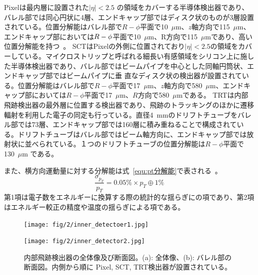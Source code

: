 Pixelは最内層に設置された$|\eta| < 2.5$ の領域をカバーする半導体検出器であり、バレル部では同心円状に4層、エンドキャップ部ではディスク状のものが3層設置されている。位置分解能はバレル部で$R-\phi$平面で10~$\mu$m、$z$軸方向で115~$\mu$m、エンドキャップ部においては$R-\rm{\phi}$平面で10~$\mu$m、R方向で115~$\mu$mであり、高い位置分解能を持つ~\cite{Aad:1129811}。
SCTはPixelの外側に位置されており$|\eta| < 2.5$の領域をカバーしている。マイクロストリップと呼ばれる細長い有感領域をシリコン上に施した半導体検出器であり、バレル部ではビームパイプを中心とした同軸円筒状、エンドキャップ部ではビームパイプに垂
直なディスク状の検出器が設置されている。位置分解能はバレル部で$R-\phi$平面で17~$\mu$m、$z$軸方向で580~$\mu$m、エンドキャップ部においては$R-\phi$平面で17~$\mu$m、$R$方向で580~$\mu$mである\cite{Aad:1129811}。
TRTは内部飛跡検出器の最外層に位置する検出器であり、飛跡のトラッキングのほかに遷移輻射を利用した電子の同定も行っている。直径4~mmのドリフトチューブをバレル部では73層、エンドキャップ部では160層に積み重ねることで構成されている。ドリフトチューブはバレル部ではビーム軸方向に、エンドキャップ部では放射状に並べられている。１つのドリフトチューブの位置分解能は$R-\phi$平面で130~$\mu$m である。

また、横方向運動量に対する分解能は式~\eqref{equ:pt分解能}で表される~\cite{Aad:1129811}。
\begin{equation}
    \frac{\sigma_{p_{T}}}{p_{T}} = 0.05 \%\times p_{T}\oplus 1 \%
　\label{equ:pt分解能}
\end{equation}
第1項は電子数をエネルギーに換算する際の統計的な揺らぎにの項であり、第2項はエネルギー較正の精度や温度の揺らぎによる項である。

\begin{figure}
    \centering
    \begin{minipage}[b]{0.4\linewidth}
        \centering
        \hspace*{-1cm}
        \texttt{[image: fig/2/inner\_detectoer1.jpg]}
        \vspace{10pt}
        \subcaption{}
        \label{fig:内部飛跡検出器の概略図1}
    \end{minipage}
    \hfill
    \begin{minipage}[b]{0.5\linewidth}
        \centering
        \texttt{[image: fig/2/inner\_detector2.jpg]}
        \vspace{10pt}
        \subcaption{}
        \label{fig:内部飛跡検出器の概略図2}
    \end{minipage}
    \caption{内部飛跡検出器の全体像及び断面図。(a): 全体像\cite{Aad:1129811}、(b): バレル部の断面図\cite{Collaboration:2723878}。内側から順に Pixel, SCT, TRT検出器が設置されている。}
    \label{fig:内部飛跡検出器}
\end{figure}




